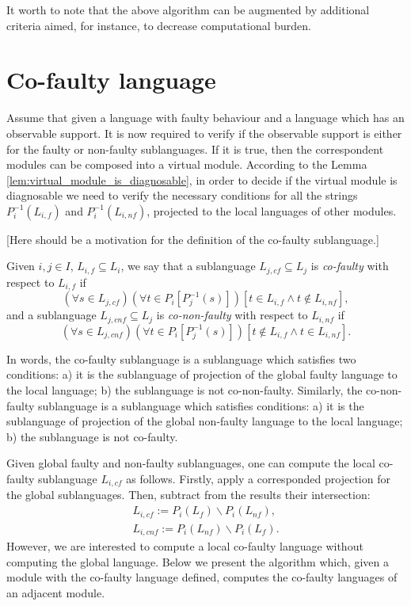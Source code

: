\documentclass[a4paper, 10pt, conference]{ieeeconf}
\begin{document}
It worth to note that the above algorithm can be augmented by additional
criteria aimed, for instance, to decrease computational burden.


\section{Co-faulty language}

Assume that given a language with faulty behaviour and a language which has an
observable support. It is now required to verify if the observable support is
either for the faulty or non-faulty sublanguages. If it is true, then the
correspondent modules can be composed into a virtual module.
According to the Lemma \ref{lem:virtual_module_is_diagnosable}, in order to
decide if the virtual module is diagnosable we need to verify the necessary
conditions for all the strings $P_i^{-1}(L_{i,f})$ and $P_i^{-1}(L_{i,nf})$,
projected to the local languages of other modules.

[Here should be a motivation for the definition of the co-faulty sublanguage.]

\begin{definition}
\label{def:co-faulty}
Given $i, j \in I$, $L_{i,f} \subseteq L_i$,
we say that a sublanguage $L_{j,cf} \subseteq L_j$ is \emph{co-faulty} with
respect to $L_{i,f}$ if 
$$
	(\forall s \in L_{j,cf})(\forall t \in P_i[P_j^{-1}(s)])
	\left[
		t \in L_{i,f} \land t \not \in L_{i,nf}   
	\right],
$$ 
and a sublanguage $L_{j,cnf} \subseteq L_j$ is
\emph{co-non-faulty} with respect to $L_{i,nf}$ if 
$$
	(\forall s \in L_{j,cnf})(\forall t \in P_i[P_j^{-1}(s)])
	\left[
		t \not \in L_{i,f} \land t \in L_{i,nf}   
	\right].
$$ 
\end{definition}

In words, the co-faulty sublanguage is a sublanguage which satisfies two
conditions:
a) it is the sublanguage of projection of the global faulty language
to the local language; b) the sublanguage is not co-non-faulty.
Similarly, the co-non-faulty sublanguage is a sublanguage which satisfies
conditions:
a) it is the sublanguage of projection of the global non-faulty language
to the local language; b) the sublanguage is not co-faulty.

Given global faulty and non-faulty sublanguages, one can compute the local
co-faulty sublanguage $L_{i,cf}$ as follows. Firstly, apply a corresponded
projection for the global sublanguages. Then, subtract from the results
their intersection:
\begin{equation}
\label{eq:co-faulty_from_global}
	\begin{array}{l}
		L_{i,cf} := P_i(L_f) \backslash P_i(L_{nf}),\\ 
		L_{i,cnf} := P_i(L_{nf}) \backslash P_i(L_{f}).	
	\end{array}
\end{equation}
However, we are interested to compute a local co-faulty
language without computing the global language. Below we present the algorithm
which, given a module with the co-faulty language defined, computes the
co-faulty languages of an adjacent module.
\end{document}
